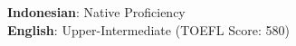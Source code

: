 

\textbf{Indonesian}: Native Proficiency \\
\textbf{English}: Upper-Intermediate (TOEFL Score: 580)